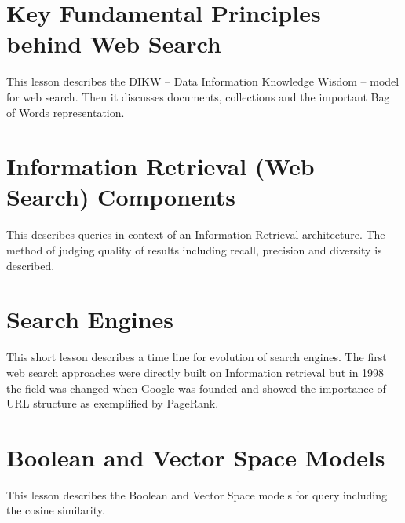 \section{Key Fundamental Principles behind Web
Search}\label{key-fundamental-principles-behind-web-search}


This lesson describes the DIKW -- Data Information Knowledge Wisdom --
model for web search. Then it discusses documents, collections and the
important Bag of Words representation.



\section{Information Retrieval (Web Search)
Components}\label{information-retrieval-web-search-components}


This describes queries in context of an Information Retrieval
architecture. The method of judging quality of results including recall,
precision and diversity is described.



\section{Search Engines}\label{search-engines}


This short lesson describes a time line for evolution of search engines.
The first web search approaches were directly built on Information
retrieval but in 1998 the field was changed when Google was founded and
showed the importance of URL structure as exemplified by PageRank.



\section{Boolean and Vector Space
Models}\label{boolean-and-vector-space-models}


This lesson describes the Boolean and Vector Space models for query
including the cosine similarity.



